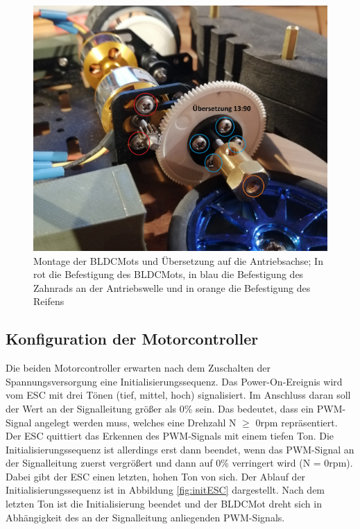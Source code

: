 \begin{figure}[H] %
\includegraphics[width=.90\textwidth]{sec4/images/MontageMotorUebersetzung} 
\centering
\captionsetup{width=.95\textwidth}
\caption[Montage der Antriebskomponenten]{Montage der \acp{BLDCMot} und Übersetzung auf die Antriebsachse; In rot die Befestigung des \ac{BLDCMot}s, in blau die Befestigung des Zahnrads an der Antriebswelle und in orange die Befestigung des Reifens}\centering
\label{fig:MontageMotorUebersetzung}
\end{figure}

\subsection{Konfiguration der Motorcontroller}\label{Sec4Sub3}

Die beiden Motorcontroller erwarten nach dem Zuschalten der Spannungsversorgung eine Initialisierungssequenz. Das Power-On-Ereignis wird vom \ac{ESC} mit drei Tönen (tief, mittel, hoch) signalisiert. Im Anschluss daran soll der Wert an der Signalleitung größer als 0\% sein. Das bedeutet, dass ein \ac{PWM}-Signal angelegt werden muss, welches eine Drehzahl N $\geq$ 0rpm repräsentiert. Der \ac{ESC} quittiert das Erkennen des \ac{PWM}-Signals mit einem tiefen Ton. Die Initialisierungssequenz ist allerdings erst dann beendet, wenn das \ac{PWM}-Signal an der Signalleitung zuerst vergrößert und dann auf 0\% verringert wird (N = 0rpm). Dabei gibt der \ac{ESC} einen letzten, hohen Ton von sich. Der Ablauf der Initialisierungssequenz ist in Abbildung \ref{fig:initESC} dargestellt. Nach dem letzten Ton ist die Initialisierung beendet und der \ac{BLDCMot} dreht sich in Abhängigkeit des an der Signalleitung anliegenden \ac{PWM}-Signals. 

